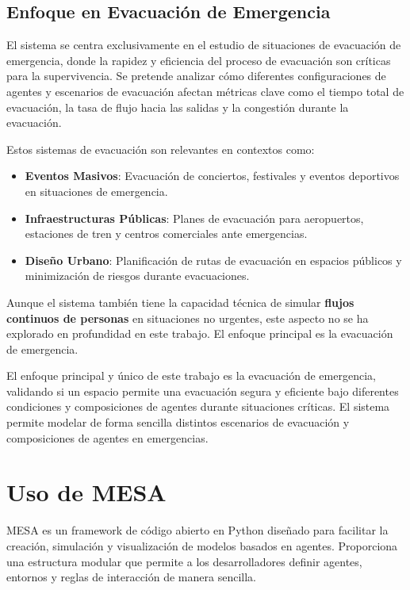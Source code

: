 \documentclass[11pt,spanish,listoffigures,listoftables]{tfgetsinf}
\begin{document}
\subsection{Enfoque en Evacuación de Emergencia}

El sistema se centra exclusivamente en el estudio de situaciones de evacuación de emergencia, donde la rapidez y eficiencia del proceso de evacuación son críticas para la supervivencia. Se pretende analizar cómo diferentes configuraciones de agentes y escenarios de evacuación afectan métricas clave como el tiempo total de evacuación, la tasa de flujo hacia las salidas y la congestión durante la evacuación.

Estos sistemas de evacuación son relevantes en contextos como:
\begin{itemize}
    \item \textbf{Eventos Masivos}: Evacuación de conciertos, festivales y eventos deportivos en situaciones de emergencia.
    \item \textbf{Infraestructuras Públicas}: Planes de evacuación para aeropuertos, estaciones de tren y centros comerciales ante emergencias.
    \item \textbf{Diseño Urbano}: Planificación de rutas de evacuación en espacios públicos y minimización de riesgos durante evacuaciones.
\end{itemize}

Aunque el sistema también tiene la capacidad técnica de simular \textbf{flujos continuos de personas} en situaciones no urgentes, este aspecto no se ha explorado en profundidad en este trabajo. El enfoque principal es la evacuación de emergencia. 

El enfoque principal y único de este trabajo es la evacuación de emergencia, validando si un espacio permite una evacuación segura y eficiente bajo diferentes condiciones y composiciones de agentes durante situaciones críticas. El sistema permite modelar de forma sencilla distintos escenarios de evacuación y composiciones de agentes en emergencias.

\section{Uso de MESA}
MESA es un framework de código abierto en Python diseñado para facilitar la creación, simulación y visualización de modelos basados en agentes. Proporciona una estructura modular que permite a los desarrolladores definir agentes, entornos y reglas de interacción de manera sencilla.
\end{document}
